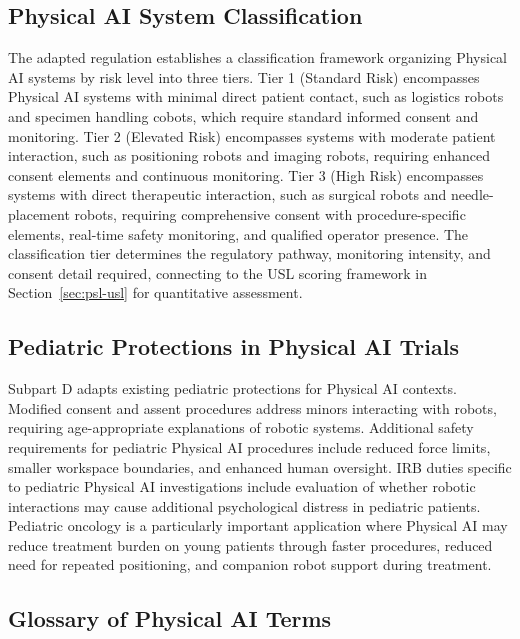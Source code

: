 \subsection{Physical AI System Classification}
\label{subsec:cfr50-classification}

The adapted regulation establishes a classification framework organizing
Physical AI systems by risk level into three tiers. Tier 1 (Standard Risk)
encompasses Physical AI systems with minimal direct patient contact, such as
logistics robots and specimen handling cobots, which require standard informed
consent and monitoring. Tier 2 (Elevated Risk) encompasses systems with
moderate patient interaction, such as positioning robots and imaging robots,
requiring enhanced consent elements and continuous monitoring. Tier 3 (High
Risk) encompasses systems with direct therapeutic interaction, such as surgical
robots and needle-placement robots, requiring comprehensive consent with
procedure-specific elements, real-time safety monitoring, and qualified
operator presence. The classification tier determines the regulatory pathway,
monitoring intensity, and consent detail required, connecting to the USL
scoring framework in Section~\ref{sec:psl-usl} for quantitative assessment.

\subsection{Pediatric Protections in Physical AI Trials}
\label{subsec:cfr50-pediatric}

Subpart D adapts existing pediatric protections for Physical AI contexts.
Modified consent and assent procedures address minors interacting with robots,
requiring age-appropriate explanations of robotic systems. Additional safety
requirements for pediatric Physical AI procedures include reduced force limits,
smaller workspace boundaries, and enhanced human oversight. IRB duties specific
to pediatric Physical AI investigations include evaluation of whether robotic
interactions may cause additional psychological distress in pediatric patients.
Pediatric oncology is a particularly important application where Physical AI may
reduce treatment burden on young patients through faster procedures, reduced
need for repeated positioning, and companion robot support during treatment.

\subsection{Glossary of Physical AI Terms}
\label{subsec:cfr50-glossary}

